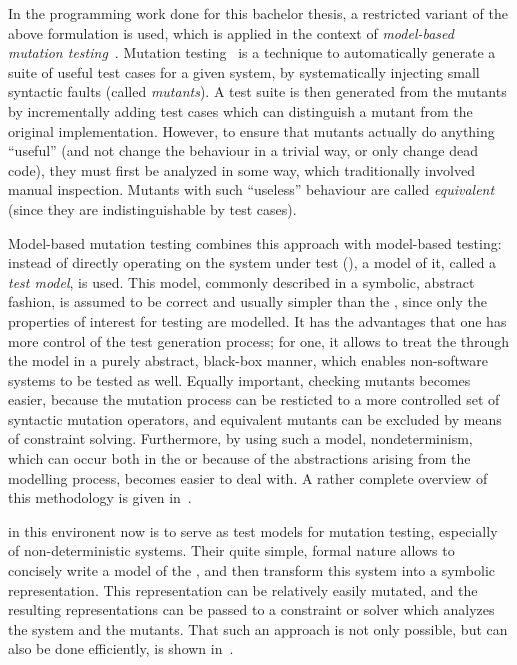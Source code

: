 In the programming work done for this bachelor thesis, a restricted variant of the above formulation
is used, which is applied in the context of \emph{model-based mutation
  testing}~\cite{aichernig2014:killing}. Mutation testing~\cite{hamlet1977:testing} is a technique
to automatically generate a suite of useful test cases for a given system, by systematically
injecting small syntactic faults (called \emph{mutants}). A test suite is then generated from the
mutants by incrementally adding test cases which can distinguish a mutant from the original
implementation. However, to ensure that mutants actually do anything \enquote{useful} (and not
change the behaviour in a trivial way, or only change dead code), they must first be analyzed in
some way, which traditionally involved manual inspection. Mutants with such \enquote{useless}
behaviour are called \emph{equivalent} (since they are indistinguishable by test cases).

Model-based mutation testing combines this approach with model-based testing: instead of directly
operating on the system under test (), a model of it, called a \emph{test model}, is
used. This model, commonly described in a symbolic, abstract fashion, is assumed to be correct and
usually simpler than the , since only the properties of interest for testing are
modelled. It has the advantages that one has more control of the test generation process; for one,
it allows to treat the  through the model in a purely abstract, black-box manner, which
enables non-software systems to be tested as well. Equally important, checking mutants becomes
easier, because the mutation process can be resticted to a more controlled set of syntactic mutation
operators, and equivalent mutants can be excluded by means of constraint solving. Furthermore, by
using such a model, nondeterminism, which can occur both in the  or because of the
abstractions arising from the modelling process, becomes easier to deal with. A rather complete
overview of this methodology is given in~\cite{jobstl2014:model-based}.

 in this environent now is to serve as test models for
mutation testing, especially of non-deterministic systems. Their quite simple, formal nature allows
to concisely write a model of the , and then transform this system into a symbolic
representation. This representation can be relatively easily mutated, and the resulting
representations can be passed to a constraint or  solver which analyzes the system and
the mutants. That such an approach is not only possible, but can also be done efficiently, is shown
in~\cite{aichernig2015:model}.\label{constraint_solving}

